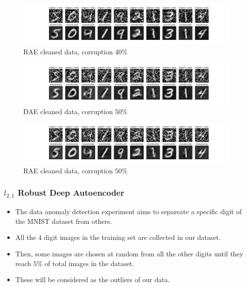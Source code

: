 \documentclass{beamer}
\theoremstyle{plain}
\theoremstyle{definition}
\theoremstyle{remark}
\begin{document}
\begin{frame}
	\begin{figure}
		\centering
		\includegraphics[width=0.95\linewidth]{Images/lam20.0corr0.4/RAE_recon.png}
		\caption[]{RAE cleaned data, corruption $40\%$}
	\end{figure}
\end{frame}

\begin{frame}
	\begin{figure}
		\centering
		\includegraphics[width=0.95\linewidth]{Images/lam20.0corr0.5/DAE_recon.png}
		\caption[]{DAE cleaned data, corruption $50\%$}
	\end{figure}
\end{frame}

\begin{frame}
	\begin{figure}
		\centering
		\includegraphics[width=0.95\linewidth]{Images/lam20.0corr0.5/RAE_recon.png}
		\caption[]{RAE cleaned data, corruption $50\%$}
	\end{figure}
\end{frame}

\begin{frame}
	\frametitle{$l_{2,1}$ Robust Deep Autoencoder}
	\begin{itemize}
		\item The data anomaly detection experiment aims to separeate a specific digit of the MNIST dataset from others.
		\item All the $4$ digit images in the training set are collected in our dataset.
		\item Then, some images are chosen at random from all the other digits until they reach $5\%$ of total images in the dataset.
		\item These will be considered as the outliers of our data.
	\end{itemize}
\end{frame}
\end{document}
